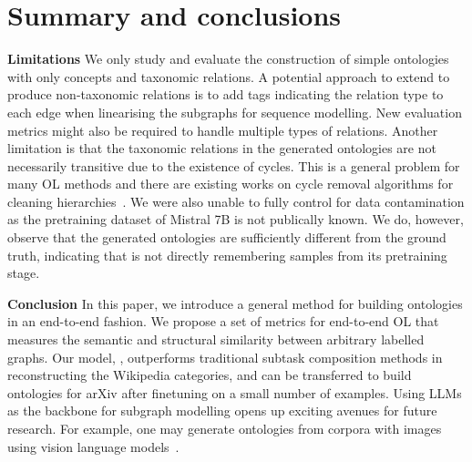 \chapter{Summary and conclusions}

\textbf{Limitations } We only study and evaluate the construction of simple ontologies with only concepts and taxonomic relations. A potential approach to extend \name to produce non-taxonomic relations is to add tags indicating the relation type to each edge when linearising the subgraphs for sequence modelling. New evaluation metrics might also be required to handle multiple types of relations. Another limitation is that the taxonomic relations in the generated ontologies are not necessarily transitive due to the existence of cycles. This is a general problem for many OL methods and there are existing works on cycle removal algorithms for cleaning hierarchies~\cite{sun2017breaking,zesch2007analysis}. We were also unable to fully control for data contamination as the pretraining dataset of Mistral 7B is not publically known. We do, however, observe that the generated ontologies are sufficiently different from the ground truth, indicating that \name is not directly remembering samples from its pretraining stage.


\textbf{Conclusion } In this paper, we introduce a general method for building ontologies in an end-to-end fashion. We propose a set of metrics for end-to-end OL that measures the semantic and structural similarity between arbitrary labelled graphs. Our model, \name, outperforms traditional subtask composition methods in reconstructing the Wikipedia categories, and can be transferred to build ontologies for arXiv after finetuning on a small number of examples. Using LLMs as the backbone for subgraph modelling opens up exciting avenues for future research. For example, one may generate ontologies from corpora with images using vision language models~\cite{donahue2015long}.